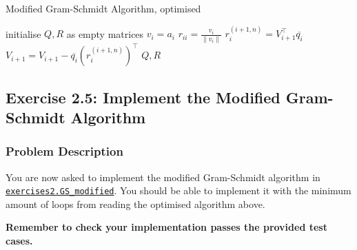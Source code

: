 \begin{algorithm}
  \caption{Modified Gram-Schmidt Algorithm, optimised}
  \label{mgs-algorithm-optimised}
  \begin{algorithmic}[1]
    \State initialise \(Q, R\)  as empty matrices
      \State \(v_i = a_i\)
      \State \(r_{ii} = \frac{v_i}{\|v_i\|}\)
      \State \(r_i^{(i + 1, n)} = V_{i + 1}^{\top}\overline{q_i}\)
      \State \(V_{i + 1} = V_{i + 1} - \overline{q_i} (r_i^{(i + 1, n)})^{\top}\)    
    \EndFor
    \State \Return \(Q, R\)
  \EndProcedure
  \end{algorithmic}
  \end{algorithm}

\subsection*{Exercise 2.5: Implement the Modified Gram-Schmidt Algorithm}
\subsubsection*{Problem Description}%
You are now asked to implement the modified Gram-Schmidt algorithm in \href{https://comp-lin-alg.github.io/cla_utils.html#cla_utils.exercises2.GS_modified}{\texttt{exercises2.GS\_modified}}. You should be able to implement it with the minimum amount of loops from reading the optimised algorithm above. \medskip

\noindent \textbf{Remember to check your implementation passes the provided test cases.}

